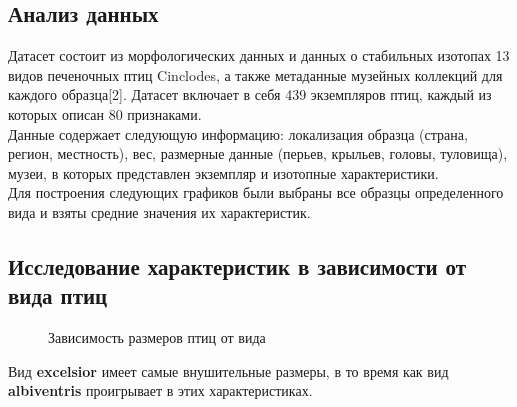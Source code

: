 \documentclass[../body.tex]{subfiles}
\begin{document}
	\subsection{Анализ данных}
	 Датасет состоит из морфологических данных и данных о стабильных изотопах 13 видов печеночных птиц Cinclodes, а также метаданные музейных коллекций для каждого образца[2]. Датасет включает в себя 439 экземпляров птиц, каждый из которых описан 80 признаками.
	 \newline \\
	Данные содержает следующую информацию: локализация образца (страна, регион, местность), вес, размерные данные (перьев, крыльев, головы, туловища), музеи, в которых представлен экземпляр и изотопные характеристики.
	\newline \\
	Для построения следующих графиков были выбраны все образцы определенного вида и взяты средние значения их характеристик.
	\subsection{Исследование характеристик в зависимости от вида птиц}
	\begin{figure}[H]
		\caption{\label{depend}Зависимость размеров птиц от вида}
	\end{figure}
Вид \textbf{excelsior} имеет самые внушительные размеры, в то время как вид \textbf{albiventris} проигрывает в этих характеристиках. 
\end{document}
